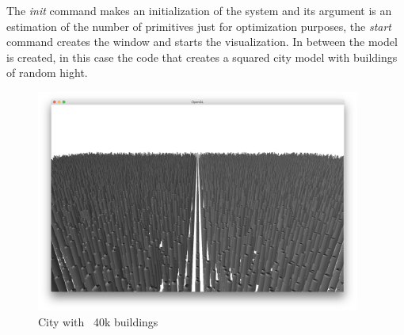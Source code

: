 The \emph{init} command makes an initialization of the system and its argument is an estimation of the number of primitives just for optimization purposes, the \emph{start} command creates the window and starts the visualization. In between the model is created, in this case the code that creates a squared city model with buildings of random hight.

\colocarFiguraMaisRodada

\begin{figure}[htb]
	\centering
	\includegraphics[width=0.95\textwidth]{img/Solution/City4-racket.png}
	\caption{City with ~40k buildings}
	\label{fig:pic1}
\end{figure}




